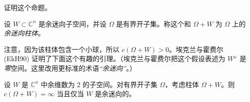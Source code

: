 \begin{exercise}\label{ex:capacities-linear-ellipsoid}
证明这个命题。
\end{exercise}

\begin{definition}\label{def:coisotropic-cylinder}
设 $W\subset\mathbb C^n$ 是余迷向子空间，并设 $\Omega$ 是有界开子集。称这个和 $\Omega+W$ 为 $\Omega$ 上的\emph{余迷向柱体}。
\end{definition}

注意，因为该柱体包含一个小球，所以 $c(\Omega+W)>0$。埃克兰与霍费尔 (EkH90) 证明了下面这个有趣的引理。（埃克兰与霍费尔把这个假设表述为 $W^\omega$ 是\emph{零}空间。这里改用更标准的术语\emph{“余迷向”}。）

\begin{lemma}[引理 3 (EkH90)]\label{lem:capacity-coisotropic-cylinder}
设 $W$ 是 $\mathbb C^n$ 中余维数为 $2$ 的子空间。对有界开子集
$\Omega$，考虑柱体 $\Omega+W$。则
$c(\Omega+W)=\infty$ 当且仅当 $W$ 是余迷向的。
\end{lemma}

